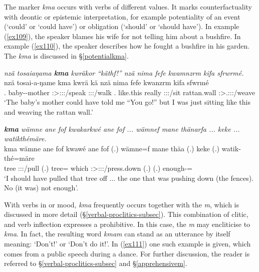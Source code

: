 The  marker \emph{kma} occurs with verbs of different  values. It marks counterfactuality with deontic or epistemic interpretation, for example potentiality of an event (`could' or `could have') or obligation (`should' or `should have'). In example (\ref{ex109}), the speaker blames his wife for not telling him about a bushfire. In example (\ref{ex110}), the speaker describes how he fought a bushfire in his garden. The  \emph{kma} is discussed in {\S}\ref{potentialkma}.

\begin{exe}
	\ex \emph{nzä tosaiaŋama \textbf{kma} kwräkor ``käthf!'' nzä nima fefe kwamnzrm kifa sfrwrmé.}\\
	\gll nzä tosai-a-ŋame kma kwrä kä nzä nima fefe kwanzrm kifa sfwrmé\\
	\Fsg.{\Abs} baby-\Poss-mother {\Pot} \Stsg:\Sbj>\Fsg:\Obj:\Irr:\Pfv/speak \Ssg:\Sbj:\Imp:\Pfv/walk \Fsg.{\Abs} {like.this} really \Fsg:\Sbj:\Pst:\Dur/sit rattan.wall \Fsg:\Sbj>\Tsg.\Masc:\Obj:\Pst:\Dur/weave\\
	\trans `The baby's mother could have told me ``You go!'' but I was just sitting like this and weaving the rattan wall.' 
	\label{ex109}
\end{exe}
\begin{exe}
	\ex \emph{\textbf{kma} wämne ane fof kwakarkwé ane fof ... wämnef mane thänarfa ... keke ... watikthémäre.}\\
	\gll kma wämne ane fof kwawé ane fof (.) wämne=f mane thäa (.) keke (.) watik-thé=märe\\
	{\Pot} tree {\Dem} {\Emph} \Fsg:\Sbj:\Rpst:\Ipfv/pull {\Dem} {\Emph} (.) tree={\Erg} which \Stsg:\Sbj>\Stpl:\Obj:\Pst:\Pfv/press.down (.) {\Neg} (.) enough-\Adlzr={\Priv}\\
	\trans `I should have pulled that tree off ... the one that was pushing down (the fences). No (it was) not enough'. 
	\label{ex110}
\end{exe}

With verbs in  or  mood, \emph{kma} frequently occurs together with the  \emph{m}, which is discussed in more detail ({\S}\ref{verbal-proclitics-subsec}). This combination of clitic,  and verb inflection expresses a prohibitive. In this case, the  \emph{m} may encliticise to \emph{kma}. In fact, the resulting word \emph{kmam} can stand as an utterance by itself meaning: `Don't!' or `Don't do it!'. In (\ref{ex111}) one such example is given, which comes from a public speech during a dance. For further discussion, the reader is referred to {\S}\ref{verbal-proclitics-subsec} and {\S}\ref{apprehensivem}.

